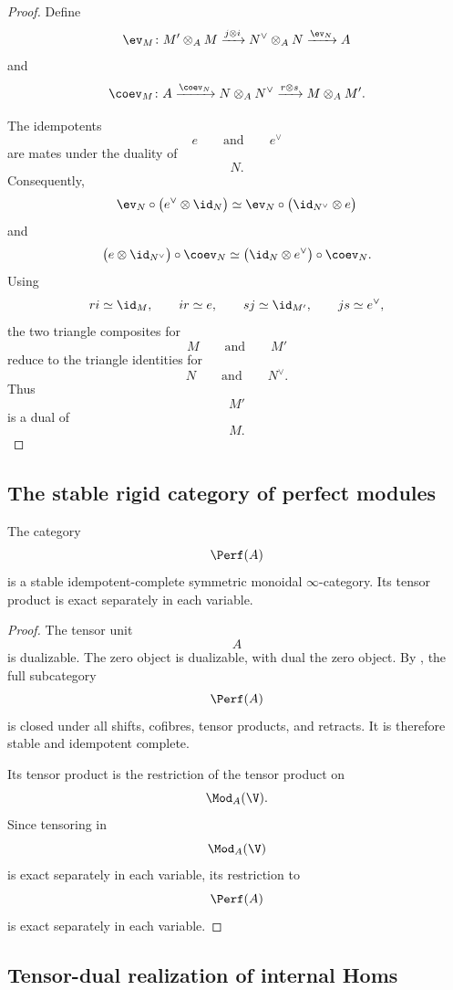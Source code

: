 \begin{proof}
Define
\[
    \ev_M
    \colon
    M'\otimes_A M
    \xrightarrow{j\otimes i}
    N^\vee\otimes_A N
    \xrightarrow{\ev_N}
    A
\]
and
\[
    \coev_M
    \colon
    A
    \xrightarrow{\coev_N}
    N\otimes_A N^\vee
    \xrightarrow{r\otimes s}
    M\otimes_A M'.
\]

The idempotents
\[
    e
    \qquad\text{and}\qquad
    e^\vee
\]
are mates under the duality of
\[
    N.
\]
Consequently,
\[
    \ev_N
    \circ
    \bigl(
        e^\vee\otimes\id_N
    \bigr)
    \simeq
    \ev_N
    \circ
    \bigl(
        \id_{N^\vee}\otimes e
    \bigr)
\]
and
\[
    \bigl(
        e\otimes\id_{N^\vee}
    \bigr)
    \circ
    \coev_N
    \simeq
    \bigl(
        \id_N\otimes e^\vee
    \bigr)
    \circ
    \coev_N.
\]
Using
\[
    r i\simeq\id_M,
    \qquad
    i r\simeq e,
    \qquad
    s j\simeq\id_{M'},
    \qquad
    j s\simeq e^\vee,
\]
the two triangle composites for
\[
    M
    \qquad\text{and}\qquad
    M'
\]
reduce to the triangle identities for
\[
    N
    \qquad\text{and}\qquad
    N^\vee.
\]
Thus
\[
    M'
\]
is a dual of
\[
    M.
\]
\end{proof}


\subsection{The stable rigid category of perfect modules}

\begin{proposition}
\label{prop:perfect-stable}
The category
\[
    \Perf(A)
\]
is a stable idempotent-complete symmetric monoidal $\infty$-category.
Its tensor product is exact separately in each variable.
\end{proposition}

\begin{proof}
The tensor unit
\[
    A
\]
is dualizable. The zero object is dualizable, with dual the zero object.
By
,
the full subcategory
\[
    \Perf(A)
\]
is closed under all shifts, cofibres, tensor products, and retracts. It is
therefore stable and idempotent complete.

Its tensor product is the restriction of the tensor product on
\[
    \Mod_A(\V).
\]
Since tensoring in
\[
    \Mod_A(\V)
\]
is exact separately in each variable, its restriction to
\[
    \Perf(A)
\]
is exact separately in each variable.
\end{proof}


\subsection{Tensor-dual realization of internal Homs}

